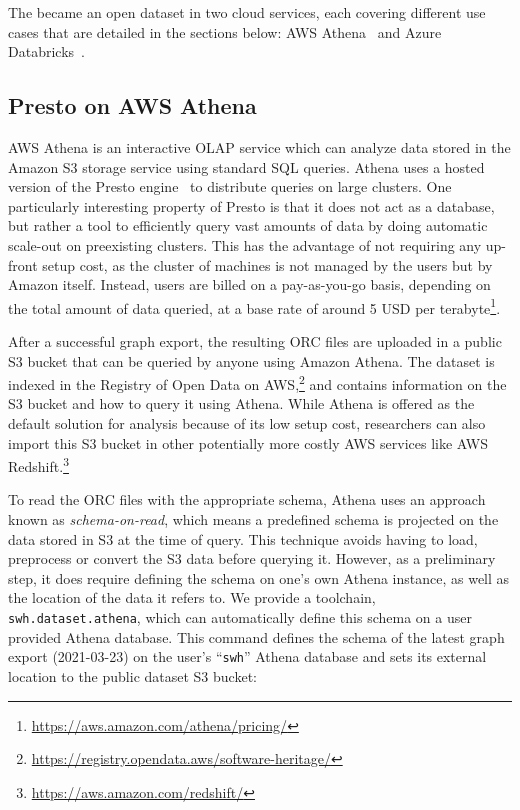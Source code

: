 The \SWHGD{} became an open dataset in two cloud services, each covering
different use cases that are detailed in the sections below: AWS
Athena~\cite{website-amazon-athena} and Azure
Databricks~\cite{website-azure-databricks}.

\subsection{Presto on AWS Athena}

AWS Athena is an interactive OLAP service which can analyze data stored in
the Amazon S3 storage service using standard SQL queries. Athena uses a hosted
version of the Presto engine~\cite{sethi2019presto} to distribute queries on
large clusters.  One particularly interesting property of Presto is that it
does not act as a database, but rather a tool to efficiently query vast amounts
of data by doing automatic scale-out on preexisting clusters. This has the
advantage of not requiring any up-front setup cost, as the cluster of machines
is not managed by the users but by Amazon itself. Instead, users are billed on
a pay-as-you-go basis, depending on the total amount of data queried, at a base
rate of around 5 USD per
terabyte\footnote{\url{https://aws.amazon.com/athena/pricing/}}.

After a successful graph export, the resulting ORC files are uploaded in a public
S3 bucket that can be queried by anyone using Amazon Athena. The dataset is
indexed in the Registry of Open Data on
AWS,\footnote{\url{https://registry.opendata.aws/software-heritage/}} and
contains information on the S3 bucket and how to query it using Athena. While
Athena is offered as the default solution for analysis because of its low setup
cost, researchers can also import this S3 bucket in other potentially more
costly AWS services like AWS
Redshift.\footnote{\url{https://aws.amazon.com/redshift/}}

To read the ORC files with the appropriate schema, Athena uses an approach
known as \emph{schema-on-read}, which means a predefined schema is projected on
the data stored in S3 at the time of query. This technique avoids having to
load, preprocess or convert the S3 data before querying it. However, as a
preliminary step, it does require defining the schema on one's own Athena
instance, as well as the location of the data it refers to. We provide a
toolchain, \texttt{swh.dataset.athena}, which can automatically define this
schema on a user provided Athena database. This command defines the schema of
the latest graph export (2021-03-23) on the user's ``\texttt{swh}'' Athena
database and sets its external location to the public dataset S3 bucket:

